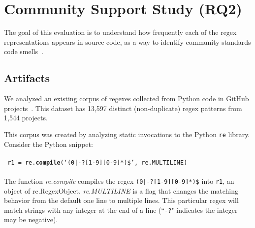 
\section{Community Support Study (RQ2)}
\label{sec:rq2}
The goal of this evaluation is to understand how frequently each of the regex representations appears in source code, as a way to identify community standards code smells~\cite{stoleeicse, stoleeTSE}. %



\subsection{Artifacts}
We analyzed an existing
corpus of regexes collected from Python code in GitHub projects~\cite{chapman2016}.
This dataset has 13,597 distinct (non-duplicate) regex patterns from 1,544 projects.

This corpus was created by analyzing static invocations to the Python {\tt re} library.
Consider the Python snippet:\\
{\footnotesize ~}\\
{\tt \footnotesize
r1 = re.\textbf{compile}(`(0|-?[1-9][0-9]*)\$', re.MULTILINE)}
\\{\footnotesize ~}\\
The function \emph{re.compile} compiles the regex \texttt{\justify(0|-?[1-9][0-9]*)\$} into \verb!r1!, an object of re.RegexObject. \emph{re.MULTILINE} is a flag that changes the matching behavior from the default one line to multiple lines. 
This particular regex will match strings with any integer at the end of a line (``\verb!-?!" indicates the integer may be negative).


